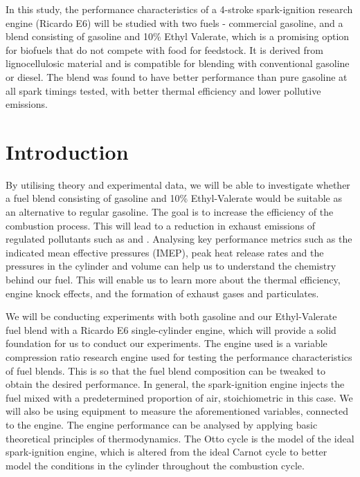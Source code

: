 In this study, the performance characteristics of a 4-stroke spark-ignition research engine (Ricardo E6) will be studied with two fuels - commercial gasoline, and a blend consisting of gasoline and 10\% Ethyl Valerate, which is a promising option for biofuels that do not compete with food for feedstock. It is derived from lignocellulosic material and is compatible for blending with conventional gasoline or diesel. The blend was found to have better performance than pure gasoline at all spark timings tested, with better thermal efficiency and lower pollutive emissions.
\section{Introduction}
By utilising theory and experimental data, we will be able to investigate whether a fuel blend consisting of gasoline and 10\% Ethyl-Valerate would be suitable as an alternative to regular gasoline. The goal is to increase the efficiency of the combustion process. This will lead to a reduction in exhaust emissions of regulated pollutants such as  and . Analysing key performance metrics such as the indicated mean effective pressures (IMEP), peak heat release rates and the pressures in the cylinder and volume can help us to understand the chemistry behind our fuel. This will enable us to learn more about the thermal efficiency, engine knock effects, and the formation of exhaust gases and particulates.

We will be conducting experiments with both gasoline and our Ethyl-Valerate fuel blend with a Ricardo E6 single-cylinder engine, which will provide a solid foundation for us to conduct our experiments. The engine used is a variable compression ratio research engine used for testing the performance characteristics of fuel blends. This is so that the fuel blend composition can be tweaked to obtain the desired performance. In general, the spark-ignition engine injects the fuel mixed with a predetermined proportion of air, stoichiometric in this case. We will also be using equipment to measure the aforementioned variables, connected to the engine. The engine performance can be analysed by applying basic theoretical principles of thermodynamics. The Otto cycle is the model of the ideal spark-ignition engine, which is altered from the ideal Carnot cycle to better model the conditions in the cylinder throughout the combustion cycle.
